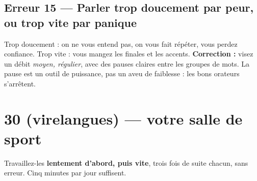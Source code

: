 \subsection{Erreur 15 --- Parler trop doucement par peur, ou trop vite par panique}
Trop doucement : on ne vous entend pas, on vous fait répéter, vous perdez confiance.
Trop vite : vous mangez les finales et les accents. \textbf{Correction :} visez un débit
\emph{moyen, régulier}, avec des pauses claires entre les groupes de mots. La pause est un
outil de puissance, pas un aveu de faiblesse : les bons orateurs s'arrêtent.

\section{30  (virelangues) --- votre salle de sport}
Travaillez-les \textbf{lentement d'abord, puis vite}, trois fois de suite chacun, sans erreur.
Cinq minutes par jour suffisent.

